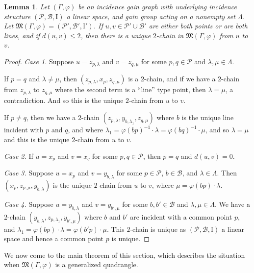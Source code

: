 \documentclass[11pt]{article}
\newtheorem{lemma}[theorem]{Lemma}
\theoremstyle{definition}
\begin{document}
\begin{lemma}
Let $(\Gamma,\varphi)$ be an incidence gain graph with underlying incidence structure $(\mathscr{P},\mathscr{B},\mathrm{I})$ a linear space, and gain group acting on a nonempty set $\Lambda$.  Let $\mathfrak{M}(\Gamma,\varphi) = (\mathscr{P}',\mathscr{B}',\mathrm{I}')$.  If $u,v \in \mathscr{P}' \cup \mathscr{B}'$ are either both points or are both lines, and if $d(u,v) \leq 2$, then there is a unique $2$-chain in $\mathfrak{M}(\Gamma,\varphi)$ from $u$ to $v$.
\end{lemma}

\begin{proof}
\textit{Case 1.}  Suppose $u = z_{p,\lambda}$ and $v = z_{q,\mu}$ for some $p,q \in \mathscr{P}$ and $\lambda,\mu \in \Lambda$.  

If $p=q$ and $\lambda \neq \mu$, then $(z_{p,\lambda}, x_p, z_{q,\mu})$ is a $2$-chain, and if we have a $2$-chain from $z_{p,\lambda}$ to $z_{q,\mu}$ where the second term is a ``line'' type point, then $\lambda = \mu$, a contradiction.  And so this is the unique $2$-chain from $u$ to $v$.  

If $p \neq q$, then we have a $2$-chain $(z_{p,\lambda}, y_{b,\lambda_1}, z_{q,\mu})$ where $b$ is the unique line incident with $p$ and $q$, and where $\lambda_1 = \varphi(bp)^{-1} \cdot \lambda = \varphi(bq)^{-1} \cdot \mu$, and so $\lambda = \mu$ and this is the unique $2$-chain from $u$ to $v$.  

\textit{Case 2.}  If $u = x_p$ and $v =x_q$ for some $p,q \in \mathscr{P}$, then $p=q$ and $d(u,v) = 0$.

\textit{Case 3.} Suppose $u = x_p$ and $v = y_{b,\lambda}$ for some $p \in \mathscr{P}$, $b \in \mathscr{B}$, and $\lambda \in \Lambda$.  Then $(x_p, z_{p,\mu}, y_{b,\lambda})$ is the unique $2$-chain from $u$ to $v$, where $\mu = \varphi(bp) \cdot \lambda$.

\textit{Case 4.} Suppose $u = y_{b,\lambda}$ and $v = y_{b',\mu}$ for some $b,b' \in \mathscr{B}$ and $\lambda, \mu \in \Lambda$.  We have a $2$-chain $(y_{b,\lambda},z_{p,\lambda_1}, y_{b',\mu})$ where $b$ and $b'$ are incident with a common point $p$, and $\lambda_1 = \varphi(bp) \cdot \lambda = \varphi(b'p) \cdot \mu$.  This $2$-chain is unique as $(\mathscr{P},\mathscr{B},\mathrm{I})$ a linear space and hence a common point $p$ is unique.
\end{proof}

We now come to the main theorem of this section, which describes the situation when $\mathfrak{M}(\Gamma,\varphi)$ is a generalized quadrangle.
\end{document}
